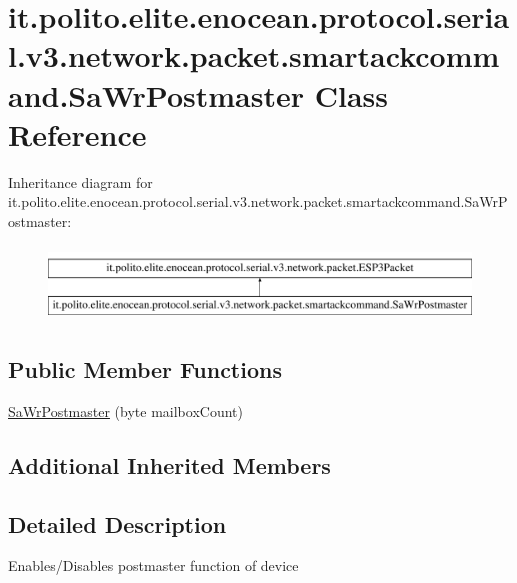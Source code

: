 \hypertarget{classit_1_1polito_1_1elite_1_1enocean_1_1protocol_1_1serial_1_1v3_1_1network_1_1packet_1_1smartackcommand_1_1_sa_wr_postmaster}{}\section{it.\+polito.\+elite.\+enocean.\+protocol.\+serial.\+v3.\+network.\+packet.\+smartackcommand.\+Sa\+Wr\+Postmaster Class Reference}
\label{classit_1_1polito_1_1elite_1_1enocean_1_1protocol_1_1serial_1_1v3_1_1network_1_1packet_1_1smartackcommand_1_1_sa_wr_postmaster}
Inheritance diagram for it.\+polito.\+elite.\+enocean.\+protocol.\+serial.\+v3.\+network.\+packet.\+smartackcommand.\+Sa\+Wr\+Postmaster\+:\begin{figure}[H]
\begin{center}
\leavevmode
\includegraphics[height=2.000000cm]{classit_1_1polito_1_1elite_1_1enocean_1_1protocol_1_1serial_1_1v3_1_1network_1_1packet_1_1smartackcommand_1_1_sa_wr_postmaster}
\end{center}
\end{figure}
\subsection*{Public Member Functions}
\begin{DoxyCompactItemize}
\item 
\hyperlink{classit_1_1polito_1_1elite_1_1enocean_1_1protocol_1_1serial_1_1v3_1_1network_1_1packet_1_1smartackcommand_1_1_sa_wr_postmaster_ab59167c5ea177628d2c366c962f31090}{Sa\+Wr\+Postmaster} (byte mailbox\+Count)
\end{DoxyCompactItemize}
\subsection*{Additional Inherited Members}


\subsection{Detailed Description}
Enables/\+Disables postmaster function of device

